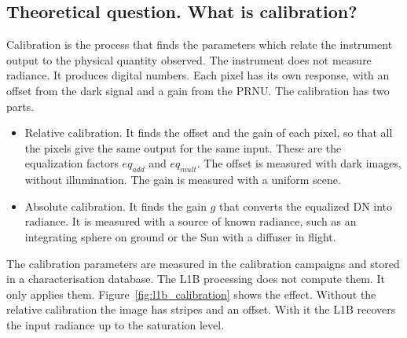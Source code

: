 \subsection{Theoretical question. What is calibration?}
Calibration is the process that finds the parameters which relate the instrument output to the physical quantity observed.
The instrument does not measure radiance. It produces digital numbers. Each pixel has its own response, with an offset from the dark signal and a gain from the PRNU.
The calibration has two parts.
\begin{itemize}
\item Relative calibration. It finds the offset and the gain of each pixel, so that all the pixels give the same output for the same input. These are the equalization factors $eq_{add}$ and $eq_{mult}$. The offset is measured with dark images, without illumination. The gain is measured with a uniform scene.
\item Absolute calibration. It finds the gain $g$ that converts the equalized DN into radiance. It is measured with a source of known radiance, such as an integrating sphere on ground or the Sun with a diffuser in flight.
\end{itemize}
The calibration parameters are measured in the calibration campaigns and stored in a characterisation database.
The L1B processing does not compute them. It only applies them.
Figure~\ref{fig:l1b_calibration} shows the effect. Without the relative calibration the image has stripes and an offset. With it the L1B recovers the input radiance up to the saturation level.

